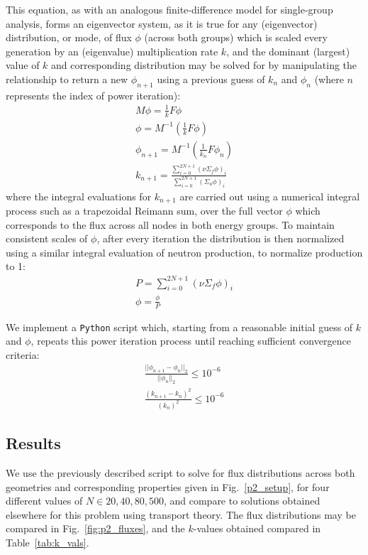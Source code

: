 \documentclass[11pt]{article} %
\newcommand{\figref}[1]{Fig.~\ref{#1}}
\begin{document}
This equation, as with an analogous finite-difference model for single-group analysis\cite{strong_npre_2026}, forms an eigenvector system, as it is true for any (eigenvector) distribution, or mode, of flux $\phi$ (across both groups) which is scaled every generation by an (eigenvalue) multiplication rate $k$, and the dominant (largest) value of $k$ and corresponding distribution may be solved for by manipulating the relationship to return a new $\phi_{n+1}$ using a previous guess of $k_n$ and $\phi_n$ (where $n$ represents the index of power iteration):
\begin{equation}
    \label{eq:pow-iter}
    \begin{gathered}
        M\phi = \frac{1}{k}F\phi \\
        \phi = M^{-1}\left(\frac{1}{k}F\phi\right)\\
        \phi_{n+1} = M^{-1}\left(\frac{1}{k_n}F\phi_n\right)\\
        k_{n+1} = \frac{\sum_{i=0}^{2N+1}(\nu\Sigma_{f}\phi)_i}{\sum_{i=0}^{2N+1}(\Sigma_{a}\phi)_i}
    \end{gathered}
\end{equation}
where the integral evaluations for $k_{n+1}$ are carried out using a numerical integral process such as a trapezoidal Reimann sum, over the full vector $\phi$ which corresponds to the flux across all nodes in both energy groups.
To maintain consistent scales of $\phi$, after every iteration the distribution is then normalized using a similar integral evaluation of neutron production, to normalize production to 1:
\begin{gather}
    P=\sum_{i=0}^{2N+1}(\nu\Sigma_{f}\phi)_i\\
    \phi = \frac{\phi}{P}
\end{gather}     

We implement a \texttt{Python} script which, starting from a reasonable initial guess of $k$ and $\phi$, repeats this power iteration process until reaching sufficient convergence criteria:
\begin{equation}
    \label{eq:convergence}
    \begin{gathered}
        \frac{||\phi_{n+1}-\phi_{n}||_2}{||\phi_n||_2} \leq 10^{-6}\\
        \frac{(k_{n+1}-k_n)^2}{(k_n)^2}\leq 10^{-6}
    \end{gathered}
\end{equation}
\subsection{Results}
\FloatBarrier
We use the previously described script to solve for flux distributions across both geometries and corresponding properties given in \figref{p2_setup}, for four different values of $N\in{20, 40, 80, 500}$, and compare to solutions obtained elsewhere for this problem using transport theory\cite{novak_computer_2026}.
The flux distributions may be compared in \figref{fig:p2_fluxes}, and the $k$-values obtained compared in Table~\ref{tab:k_vals}.\\
\end{document}
